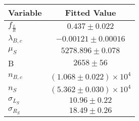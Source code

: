 \begin{tabular}[t]{lc}
\hline
Variable &Fitted Value\\
\hline\hline
$f_{\frac{L}{R}}$&$0.437\pm0.022$\\
\hline
$\lambda_{B,c}$&$-0.00121\pm0.00016$\\
\hline
$\mu_S$&$5278.896\pm0.078$\\
\hline
B&$2658\pm56$\\
\hline
$n_{B,c}$&$(1.068\pm0.022)\times 10^4$\\
\hline
$n_S$&$(5.362\pm0.030)\times 10^4$\\
\hline
$\sigma_{L_S}$&$10.96\pm0.22$\\
\hline
$\sigma_{R_S}$&$18.49\pm0.26$\\
\hline
\end{tabular}